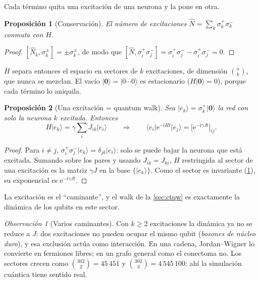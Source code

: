 \documentclass[11pt,a4paper]{article}
\renewcommand{\ket}[1]{\lvert #1\rangle}
\renewcommand{\bra}[1]{\langle #1\rvert}
\newcommand{\vac}{\ket{\mathbf{0}}}
\newcommand{\e}{\mathrm{e}}
\newcommand{\ii}{\mathrm{i}}
\newcommand{\Nop}{\hat N}
\theoremstyle{plain}
\newtheorem{proposicion}{Proposición}[section]
\theoremstyle{definition}
\theoremstyle{remark}
\newtheorem*{observacion}{Observación}
\begin{document}
Cada término quita una excitación de una neurona y la pone en otra.

\begin{proposicion}[Conservación]\label{prop:conservacion}
El número de excitaciones $\Nop=\sum_k\sigma_k^+\sigma_k^-$ conmuta con $H$.
\end{proposicion}

\begin{proof}
$[\Nop_k,\sigma_k^\pm]=\pm\sigma_k^\pm$, de modo que $[\Nop,\sigma_i^+\sigma_j^-]=\sigma_i^+\sigma_j^--\sigma_i^+\sigma_j^-=0$.
\end{proof}

$H$ separa entonces el espacio en sectores de $k$ excitaciones, de dimensión $\binom nk$, que nunca se mezclan. El vacío $\vac=\ket{0\cdots0}$ es estacionario ($H\vac=0$), porque cada término lo aniquila.

\begin{proposicion}[Una excitación = quantum walk]\label{prop:ctqw}
Sea $\ket{e_k}=\sigma_k^+\vac$ la red con solo la neurona $k$ excitada. Entonces
\begin{equation}
H\ket{e_k}=\gamma\sum_iJ_{ik}\ket{e_i}
\qquad\Longrightarrow\qquad
\bra{e_i}\e^{-\ii Ht}\ket{e_j}=\bigl[\e^{-\ii\gamma Jt}\bigr]_{ij}.
\end{equation}
\end{proposicion}

\begin{proof}
Para $i\ne j$, $\sigma_i^+\sigma_j^-\ket{e_k}=\delta_{jk}\ket{e_i}$: solo se puede bajar la neurona que está excitada. Sumando sobre los pares y usando $J_{ik}=J_{ki}$, $H$ restringida al sector de una excitación es la matriz $\gamma J$ en la base $\{\ket{e_k}\}$. Como el sector es invariante (\cref{prop:conservacion}), su exponencial es $\e^{-\ii\gamma Jt}$.
\end{proof}

La excitación es el ``caminante'', y el walk de la \cref{sec:ctqw} es exactamente la dinámica de los qubits en este sector.

\begin{observacion}[Varios caminantes]
Con $k\ge2$ excitaciones la dinámica ya no se reduce a $J$: dos excitaciones no pueden ocupar el mismo qubit (\emph{bosones de núcleo duro}), y esa exclusión actúa como interacción. En una cadena, Jordan--Wigner lo convierte en fermiones libres; en un grafo general como el conectoma no. Los sectores crecen como $\binom{302}{2}=45\,451$ y $\binom{302}{3}=4\,545\,100$: ahí la simulación cuántica tiene sentido real.
\end{observacion}
\end{document}
